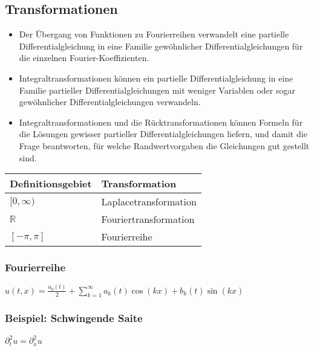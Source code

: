 \subsection{Transformationen}
\begin{itemize}
\item Der Übergang von Funktionen zu Fourierreihen verwandelt eine partielle
Differentialgleichung in eine Familie gewöhnlicher Differentialgleichungen für
die einzelnen Fourier-Koeffizienten.
\item Integraltransformationen können ein partielle Differentialgleichung in eine
Familie partieller Differentialgleichungen mit weniger Variablen oder sogar
gewöhnlicher Differentialgleichungen verwandeln.
\item Integraltransformationen und die Rücktransformationen können Formeln
für die Lösungen gewisser partieller Differentialgleichungen liefern, und
damit die Frage beantworten, für welche Randwertvorgaben die Gleichungen
gut gestellt sind.
\end{itemize}

\begin{tabular}{ll}
  Definitionsgebiet & Transformation \\
  \hline
  $[0, \infty)$ & Laplacetransformation \\
  $\mathbb{R}$ & Fouriertransformation \\
  $[- \pi, \pi]$ & Fourierreihe \\
\end{tabular}

\subsubsection{Fourierreihe}
$\boxed{u(t,x)=\frac{a_0(t)}{2}+\sum\limits_{k=1}^{\infty}{a_k(t)\cos(kx)+b_k(t)\sin(kx)}}$\\[0.4cm]

\subsubsection{Beispiel: Schwingende Saite}

$\boxed{\partial_t^2u=\partial_x^2u}$

